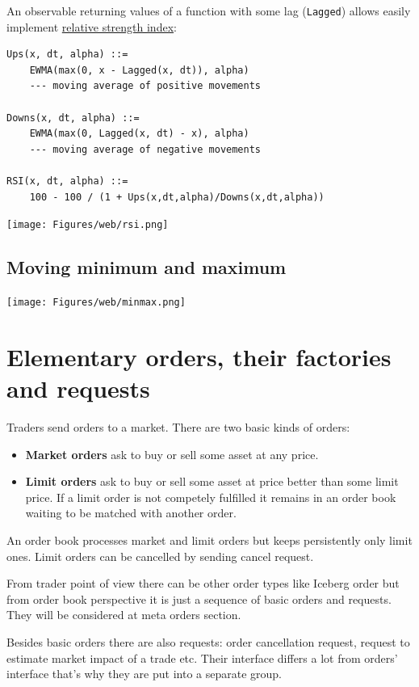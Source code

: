 \documentclass[a4paper,11pt]{article}
\begin{document}
An observable returning values of a function with some lag
(\texttt{Lagged}) allows easily implement
\href{http://en.wikipedia.org/wiki/Relative_strength_index}{relative
strength index}:

\begin{verbatim}
Ups(x, dt, alpha) ::= 
    EWMA(max(0, x - Lagged(x, dt)), alpha) 
    --- moving average of positive movements
	
Downs(x, dt, alpha) ::= 
    EWMA(max(0, Lagged(x, dt) - x), alpha) 
    --- moving average of negative movements
	
RSI(x, dt, alpha) ::= 
    100 - 100 / (1 + Ups(x,dt,alpha)/Downs(x,dt,alpha))
\end{verbatim}
\centerline{\texttt{[image: Figures/web/rsi.png]}}

\subsection{Moving minimum and maximum}\label{moving-minimum-and-maximum}
\centerline{\texttt{[image: Figures/web/minmax.png]}}

\section{Elementary orders, their factories and
requests}\label{elementary-orders-their-factories-and-requests}

Traders send orders to a market. There are two basic kinds of orders:

\begin{itemize}
\itemsep1pt\parskip0pt
\item
  \textbf{Market orders} ask to buy or sell some asset at any price.
\item
  \textbf{Limit orders} ask to buy or sell some asset at price better
  than some limit price. If a limit order is not competely fulfilled it
  remains in an order book waiting to be matched with another order.
\end{itemize}

An order book processes market and limit orders but keeps persistently
only limit ones. Limit orders can be cancelled by sending cancel
request.

From trader point of view there can be other order types like
Iceberg order but from order book
perspective it is just a sequence of basic orders and requests. They
will be considered at meta orders section.

Besides basic orders there are also requests: order cancellation
request, request to estimate market impact of a trade etc. Their
interface differs a lot from orders' interface that's why they are put
into a separate group.
\end{document}
